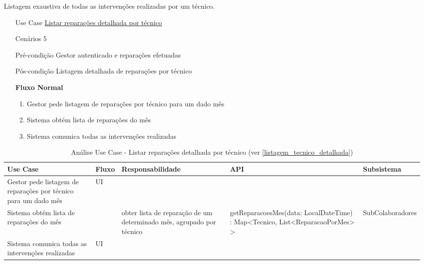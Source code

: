 \documentclass[../relatorio.tex]{subfiles}
\begin{document}
Listagem exaustiva de todas as intervenções realizadas por um técnico.
\begin{itemize}
    \item[Use Case] {\underline{Listar reparações detalhada por técnico}}
    \item[Cenários] {5}
    \item[Pré-condição] {Gestor autenticado e reparações efetuadas}
    \item[Pós-condição] {Listagem detalhada de reparações por técnico}
          \begin{flushleft}
              \textbf{Fluxo Normal}
          \end{flushleft}
          \begin{enumerate}
              \item Gestor pede listagem de reparações por técnico para um dado mês %
              \item Sistema obtém lista de reparações do mês %
              \item Sistema comunica todas as intervenções realizadas %
          \end{enumerate}
\end{itemize}
\begin{landscape}
    \begin{table}[!h]
        \centering
        \begin{tabular}{|p{5cm}|p{1cm}|p{4cm}|p{6cm}|p{4cm}|}
            \hline
            \rowcolor{gray!20!white}
            Use Case & Fluxo & Responsabilidade & API & Subsistema \\
            \hline
            \rowcolor{yellow}
            Gestor pede listagem de reparações por técnico para um dado mês
                     & 
            UI
                     & 
                     & 
                     & 
            \\
            \hline
            Sistema obtém lista de reparações do mês
                     & 
                     & 
            obter lista de reparação de um determinado mês, agrupado por técnico
                     & 
            getReparacoesMes(data: LocalDateTime) : Map<Tecnico, List<ReparacaoPorMes> >
                     & 
            SubColaboradores
            \\
            \hline
            \rowcolor{yellow}
            Sistema comunica todas as intervenções realizadas
                     & 
            UI
                     & 
                     & 
                     & 
            \\
        \end{tabular}
        \caption{Análise Use Case - Listar reparações detalhada por técnico (ver \ref{listagem_tecnico_detalhada})}
    \end{table}
\end{landscape}
\end{document}
